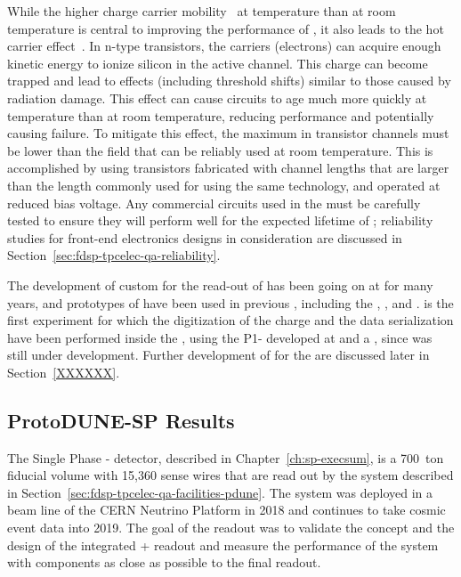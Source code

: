 While the higher charge carrier mobility~\cite{Hairapetian1989} at  temperature than at room
temperature is central to improving the performance of , it also leads
to the hot carrier effect~\cite{Hot-electron}. In n-type  transistors, the carriers (electrons)
can acquire enough kinetic energy to ionize silicon in the active channel. This
charge can become trapped and lead to effects (including threshold shifts)
similar to those caused by radiation damage. This effect can cause 
circuits to age much more quickly at  temperature than at room temperature,
reducing performance and potentially causing failure. To mitigate this effect,
the maximum \efield in transistor channels must be lower than the field that
can be reliably used at room temperature. This is accomplished by using transistors
fabricated with channel lengths that are larger than the length commonly used
for  using the same technology, and operated at reduced bias voltage. 
Any commercial circuits used in the  must be carefully tested to ensure 
they will perform well for the expected \dunelifetime lifetime of ; 
reliability studies for front-end electronics designs in consideration are 
discussed in Section~\ref{sec:fdsp-tpcelec-qa-reliability}.

The development of custom  for the read-out of 
 has been going on at  for many years, and prototypes
of  have been used in previous  , 
including the , , and .  is the first
experiment for which the digitization of the charge and the data serialization
have been performed inside the \lar, using the P1-  
developed at  and a , since  was
still under development. Further development of  for the
  are discussed later in Section~\ref{XXXXXX}.

\subsection{ProtoDUNE-SP Results}
\label{sec:fdsp-tpcelec-overview-pdune}

The Single Phase - detector, described 
in Chapter~\ref{ch:sp-execsum}, is a 700~ton fiducial volume 
 with 15,360 sense wires that are read out by 
the  system described in Section~\ref{sec:fdsp-tpcelec-qa-facilities-pdune}. 
The system was deployed in a beam line of the CERN Neutrino Platform 
in 2018 and continues to take cosmic event data into 2019. The goal of 
the   readout was to validate the concept 
and the design of the integrated + readout 
and measure the performance of the  system with components 
as close as possible to the final   readout.

